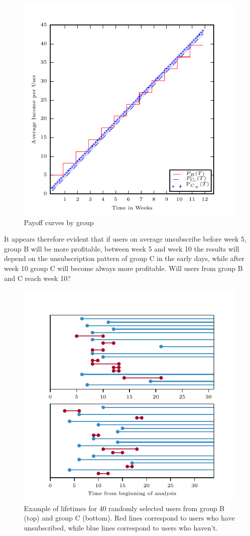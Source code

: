\documentclass[paper=a4, fontsize=10pt]{report}
\begin{document}
\begin{figure}[h!]
\centering
\captionsetup{justification=centering}
\includegraphics[width=.9\columnwidth]{profit.pdf}
\caption{Payoff curves by group}
\label{fig:profit}
\end{figure}


It appears therefore evident that if users on average unsubscribe before week 5, group B will be more profitable, between
week 5 and week 10 the results will depend on the unsubscription pattern of group C in the early days, while after week 10 group C
will become always more profitable. Will users from group B and C reach week 10?
\begin{figure}[h!]
\centering
\captionsetup{justification=centering}
\includegraphics[width=.9\columnwidth]{lifetime.pdf}
\caption{Example of lifetimes for 40 randomly selected users from group B (top) and group C (bottom). Red lines
correspond to users who have unsubscribed, while blue lines correspond to users who haven't.}
\label{fig:lifetimes}
\end{figure}
\end{document}
